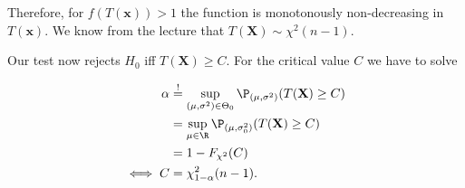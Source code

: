 \begin{solution}
Therefore, for $f(T(\textbf{x})) > 1$ the function is monotonously non-decreasing in $T(\textbf{x})$.
We know from the lecture that $T(\textbf{X}) \sim  \chi^2(n-1)$.


Our test now rejects $H_0$ iff $T(\textbf{X}) \geq C$.
For the critical value $C$ we have to solve

\begin{align*}
  \alpha &\stackrel{!}{=} \sup_{(\mu, \sigma^2) \in \Theta_0} \P_{(\mu, \sigma^2)}(T(\textbf{X}) \geq C) \\
  &= \sup_{\mu \in \R} \P_{(\mu, \sigma_0^2)}(T(\textbf{X}) \geq C) \\
  &= 1 - F_{\chi^2}(C) \\
  \iff C &= \chi_{1 - \alpha}^2(n-1).
\end{align*}
\end{solution}

